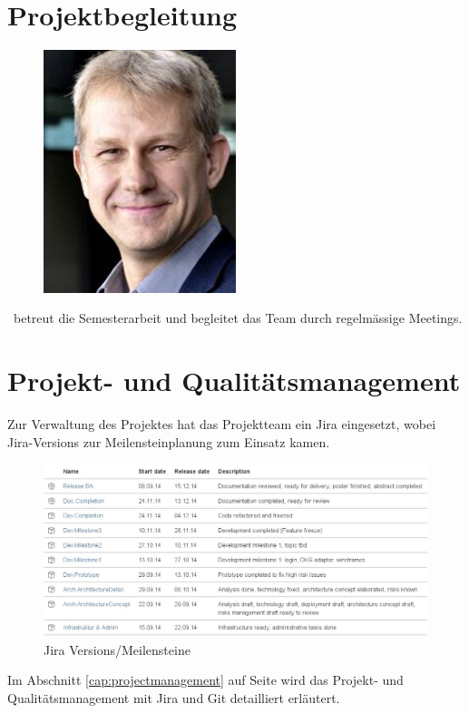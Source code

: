 	\section{Projektbegleitung}
	\begin{figure}[H]
		\begin{minipage}[b]{0.5\linewidth}
			\includegraphics[width=0.5\textwidth]{projectPlan/media/img/ozimmermann.jpg}
			\centering
			\caption{\teacher}
			\label{fig:olafzimmermann}
		\end{minipage}
	\end{figure}
	\teacher\ betreut die Semesterarbeit und begleitet das Team durch regelmässige Meetings.


	\section{Projekt- und Qualitätsmanagement}
		Zur Verwaltung des Projektes hat das Projektteam ein Jira eingesetzt,
		wobei Jira-Versions zur Meilensteinplanung zum Einsatz kamen.
		
		\begin{figure}[H]
			\includegraphics[width=\textwidth]{projectPlan/media/img/jiraVersions.jpg}
			\centering
			\caption{Jira Versions/Meilensteine}
			\label{fig:jiraVersions}
		\end{figure}
		
		Im Abschnitt \ref{cap:projectmanagement} auf Seite \pageref{cap:projectmanagement} wird das Projekt- und Qualitätsmanagement mit Jira und Git detailliert erläutert.
	

